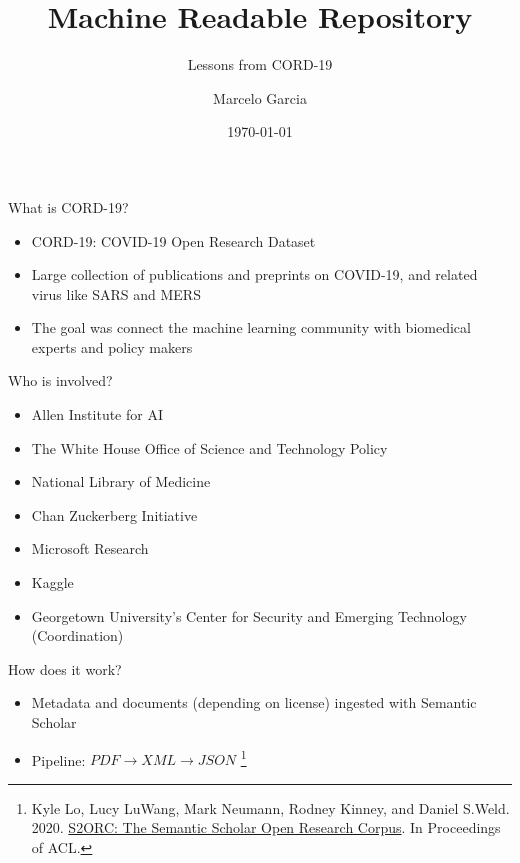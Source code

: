\documentclass{beamer}
\title{Machine Readable Repository}
\subtitle{Lessons from CORD-19}
\author{Marcelo Garcia}
\institute{KAUST University Library}
\date{\today}
\begin{document}
\begin{frame}
\titlepage
\end{frame}

\begin{frame}{What is CORD-19?}
    \begin{itemize}
        \item CORD-19: COVID-19 Open Research Dataset
        \item Large collection of publications and preprints on COVID-19, and related virus like SARS and MERS
        \item The goal was connect the machine learning community with biomedical experts and policy makers    
    \end{itemize}
\end{frame}

\begin{frame}{Who is involved?}
    \begin{itemize}
        \item Allen Institute for AI
        \item The White House Office of Science and Technology Policy
        \item National Library of Medicine
        \item Chan Zuckerberg Initiative
        \item Microsoft Research
        \item Kaggle
        \item Georgetown University's Center for Security and Emerging Technology (Coordination)
    \end{itemize}
\end{frame}

\begin{frame}{How does it work?}
    \begin{itemize}
        \item Metadata and documents (depending on license) ingested with Semantic Scholar
        \item Pipeline: $PDF \rightarrow XML \rightarrow JSON$ \footnote{Kyle Lo, Lucy LuWang, Mark Neumann, Rodney Kinney, and Daniel S.Weld. 2020. \href{https://arxiv.org/abs/1911.02782}{S2ORC: The Semantic Scholar Open Research Corpus}. In Proceedings of ACL.}
    \end{itemize}
\end{frame}
\end{document}

